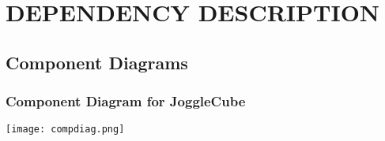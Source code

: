 \section{DEPENDENCY DESCRIPTION}
	\subsection{Component Diagrams}
		\subsubsection{Component Diagram for JoggleCube}
        \texttt{[image: compdiag.png]}